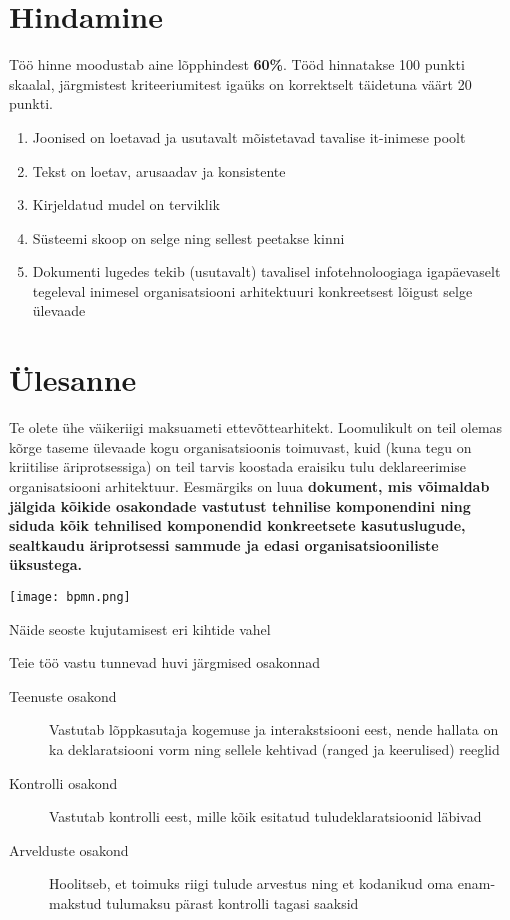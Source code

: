 \documentclass[nobib]{tufte-handout}
\begin{document}
\section{Hindamine}
Töö hinne moodustab aine lõpphindest \textbf{60\%}. Tööd hinnatakse 100 punkti skaalal,  järgmistest kriteeriumitest igaüks on korrektselt täidetuna väärt 20 punkti.
\begin{enumerate}
	\item Joonised on loetavad ja usutavalt mõistetavad tavalise it-inimese poolt
	\item Tekst on loetav, arusaadav ja konsistente
	\item Kirjeldatud mudel on terviklik
	\item Süsteemi skoop on selge ning sellest peetakse kinni
	\item Dokumenti lugedes tekib (usutavalt) tavalisel infotehnoloogiaga igapäevaselt tegeleval inimesel organisatsiooni arhitektuuri konkreetsest lõigust selge ülevaade
\end{enumerate}

\section{Ülesanne}
Te olete ühe väikeriigi maksuameti ettevõttearhitekt. Loomulikult on teil olemas kõrge taseme ülevaade kogu organisatsioonis toimuvast, kuid (kuna tegu on kriitilise äriprotsessiga) on teil tarvis koostada eraisiku tulu deklareerimise organisatsiooni arhitektuur. Eesmärgiks on luua \textbf{dokument, mis võimaldab jälgida kõikide osakondade vastutust tehnilise komponendini ning siduda kõik tehnilised komponendid konkreetsete kasutuslugude, sealtkaudu äriprotsessi sammude ja edasi organisatsiooniliste üksustega.}
\begin{marginfigure}%
  \texttt{[image: bpmn.png]}
  \caption{Näide seoste kujutamisest eri kihtide vahel}
  \label{fig:bpmn}
\end{marginfigure}


Teie töö vastu tunnevad huvi järgmised osakonnad
\begin{description}
	\item[Teenuste osakond] Vastutab lõppkasutaja kogemuse ja interakstsiooni eest, nende hallata on ka deklaratsiooni vorm ning sellele kehtivad (ranged ja keerulised) reeglid
	\item[Kontrolli osakond] Vastutab kontrolli eest, mille kõik esitatud tuludeklaratsioonid läbivad
	\item[Arvelduste osakond] Hoolitseb, et toimuks riigi tulude arvestus ning et kodanikud oma enam-makstud tulumaksu pärast kontrolli tagasi saaksid
\end{description}
\end{document}
